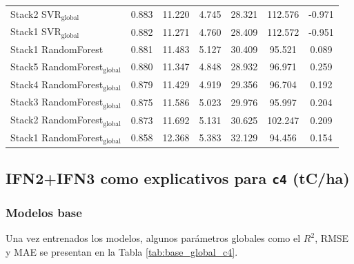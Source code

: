 \begin{table}[tp]
{\begin{tabular}{p{4.5cm}cccccc}
        Stack2 SVR$_{\text{global}}$ & 0.883 & 11.220 & 4.745 & 28.321 & 112.576 & -0.971 \\
        Stack1 SVR$_{\text{global}}$ & 0.882 & 11.271 & 4.760 & 28.409 & 112.572 & -0.951 \\
        Stack1 RandomForest & 0.881 & 11.483 & 5.127 & 30.409 & 95.521 & 0.089 \\
        Stack5 RandomForest$_{\text{global}}$ & 0.880 & 11.347 & 4.848 & 28.932 & 96.971 & 0.259 \\
        Stack4 RandomForest$_{\text{global}}$ & 0.879 & 11.429 & 4.919 & 29.356 & 96.704 & 0.192 \\
        Stack3 RandomForest$_{\text{global}}$ & 0.875 & 11.586 & 5.023 & 29.976 & 95.997 & 0.204 \\
        Stack2 RandomForest$_{\text{global}}$ & 0.873 & 11.692 & 5.131 & 30.625 & 102.247 & 0.209 \\
        Stack1 RandomForest$_{\text{global}}$ & 0.858 & 12.368 & 5.383 & 32.129 & 94.456 & 0.154 \\
            \bottomrule
    \end{tabular}
    }
\end{table}


\clearpage
\subsection{IFN2+IFN3 como explicativos para \texttt{c4} (tC/ha)}

\subsubsection{Modelos base}

Una vez entrenados los modelos, algunos parámetros globales como el $R^2$, RMSE y MAE se presentan en la Tabla \ref{tab:base_global_c4}.


